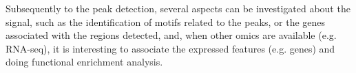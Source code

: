 Subsequently to the peak detection, several aspects can be investigated about the signal, such as the identification of motifs related to the peaks, or the genes associated with the regions detected, and, when other omics are available (e.g. RNA-seq), it is interesting to associate the expressed features (e.g. genes) and doing functional enrichment analysis. 





